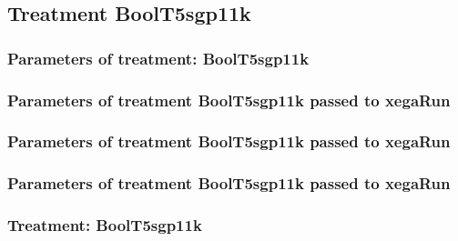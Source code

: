 \documentclass[18pt,c]{beamer}
\begin{document}
\clearpage
\subsection{Treatment BoolT5sgp11k}

 \begin{frame}
 \fontsize{8pt}{9pt}\selectfont
 \frametitle{  Parameters of treatment: BoolT5sgp11k 
 }

 \label{ExpFtParmTable004.tex}  
 \end{frame}


 \begin{frame}
 \fontsize{8pt}{9pt}\selectfont
 \frametitle{  Parameters of treatment BoolT5sgp11k passed to xegaRun
 }

 \label{ExpFtParmTable005.tex}  
 \end{frame}


 \begin{frame}
 \fontsize{8pt}{9pt}\selectfont
 \frametitle{  Parameters of treatment BoolT5sgp11k passed to xegaRun
 }

 \label{ExpFtParmTable006.tex}  
 \end{frame}


 \begin{frame}
 \fontsize{8pt}{9pt}\selectfont
 \frametitle{  Parameters of treatment BoolT5sgp11k passed to xegaRun
 }

 \label{ExpFtParmTable007.tex}  
 \end{frame}

 \begin{frame}
 \fontsize{8pt}{9pt}\selectfont
 \frametitle{ Treatment: BoolT5sgp11k }

 \label{ExpFStatsTable004.tex}  
 \end{frame}
\end{document}

